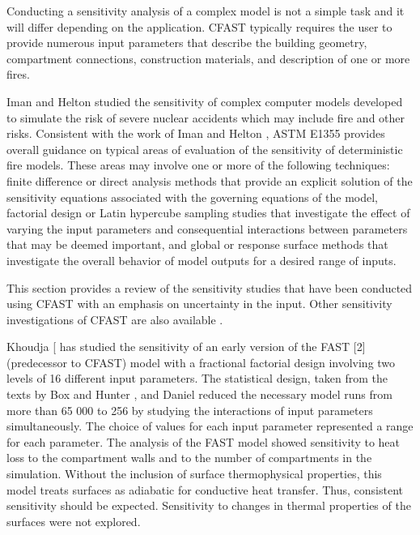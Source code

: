 Conducting a sensitivity analysis of a complex model is not a simple task and it will differ depending on the application. CFAST typically requires the user to provide numerous input parameters that describe the building geometry, compartment connections, construction materials, and description of one or more fires. 

Iman and Helton \cite{Iman:1988} studied the sensitivity of complex computer models developed to simulate the risk of severe nuclear accidents which may include fire and other risks. Consistent with the work of Iman and Helton \cite{Iman:1988}, ASTM E1355 \cite{ASTM:E1355} provides overall guidance on typical areas of evaluation of the sensitivity of deterministic fire models.  These areas may involve one or more of the following techniques: finite difference or direct analysis methods that provide an explicit solution of the sensitivity equations associated with the governing equations of the model, factorial design or Latin hypercube sampling studies that investigate the effect of varying the input parameters and consequential interactions between parameters that may be deemed important, and global or response surface methods that investigate the overall behavior of model outputs for a desired range of inputs. 

This section provides a review of the sensitivity studies that have been conducted using CFAST 
with an emphasis on uncertainty in the input. Other sensitivity investigations of CFAST are also 
available \cite{Peacock:1988a, Beard:1992, Notarianni:2000}. 

Khoudja [\cite{Khoudja:1988} has studied the sensitivity of an early version of the FAST [2] (predecessor to CFAST) model with a fractional factorial design involving two levels of 16 different input parameters. The statistical design, taken from the texts by Box and Hunter \cite{Box:1978}, and Daniel \cite{Daniel:1976} reduced the necessary model runs from more than 65 000 to 256 by studying the interactions of input parameters simultaneously. The choice of values for each input parameter represented a range for each parameter. The analysis of the FAST model showed sensitivity to heat loss to the compartment walls and to the number of compartments in the simulation. Without the inclusion of surface thermophysical properties, this model treats surfaces as adiabatic for conductive heat transfer. Thus, consistent sensitivity should be expected. Sensitivity to changes in thermal properties of the surfaces were not explored. 

